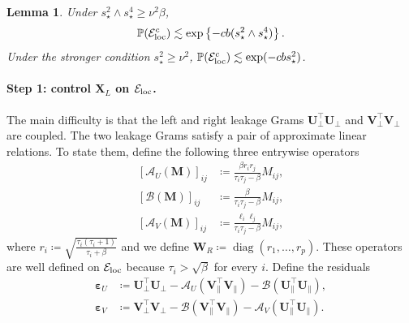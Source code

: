 \documentclass[11pt]{article}
\newtheorem{lemma}{Lemma}
\newcommand{\Pp}{\mathbb{P}}
\newcommand{\trans}{\top}
\DeclareMathOperator{\diag}{diag}
\newcommand{\cE}{\mathcal{E}}
\begin{document}
\begin{lemma}
\label{lem:one-view-localization}
Under $s_\star^2\wedge s_\star^4\ge\nu^2\beta$,
\begin{equation}
\label{eq:one-view-tail-under-left}
  \Pp(\cE_{\rm loc}^c)
  \lesssim
  \exp\left\{
    -c b(s_\star^2\wedge s_\star^4)
  \right\}.
\end{equation}
Under the stronger condition $s_\star^2\ge\nu^2$,
$\Pp(\cE_{\rm loc}^c)\lesssim\exp(-cbs_\star^2)$.
\end{lemma}


\paragraph{Step 1: control $\bm X_L$ on $\cE_{\rm loc}$.}
The main difficulty is that the left and right leakage Grams
$\bm U_\perp^\trans\bm U_\perp$ and
$\bm V_\perp^\trans\bm V_\perp$ are coupled. The two leakage Grams satisfy a pair of approximate linear relations. To state them, define the following three entrywise operators 
\begin{subequations}
\label{eq:one-view-population-operators}
\begin{align}
  [\mathcal A_U(\bm M)]_{ij}
  &\coloneqq
  \frac{\beta r_ir_j}{\tau_i\tau_j-\beta}M_{ij},
  \label{eq:one-view-population-operator-U}\\
  [\mathcal B(\bm M)]_{ij}
  &\coloneqq
  \frac{\beta}{\tau_i\tau_j-\beta}M_{ij},
  \label{eq:one-view-population-operator-B}\\
  [\mathcal A_V(\bm M)]_{ij}
  &\coloneqq
  \frac{\ell_i\ell_j}{\tau_i\tau_j-\beta}M_{ij},
  \label{eq:one-view-population-operator-V}
\end{align}
\end{subequations}
where $r_i\coloneqq\sqrt{\frac{\tau_i(\tau_i+1)}{\tau_i+\beta}}$ and we define $\bm W_R\coloneqq\diag(r_1,\ldots,r_p)$. 
These operators are well defined on $\cE_{\rm loc}$ because
$\tau_i>\sqrt\beta$ for every $i$. Define the residuals
\begin{subequations}
\label{eq:one-view-eps}
\begin{align}
  \bm\varepsilon_U
  &\coloneqq
  \bm U_\perp^\trans\bm U_\perp
  -
  \mathcal A_U(\bm V_\parallel^\trans\bm V_\parallel)
  -
  \mathcal B(\bm U_\parallel^\trans\bm U_\parallel),
  \label{eq:one-view-eps-U}\\
  \bm\varepsilon_V
  &\coloneqq
  \bm V_\perp^\trans\bm V_\perp
  -
  \mathcal B(\bm V_\parallel^\trans\bm V_\parallel)
  -
  \mathcal A_V(\bm U_\parallel^\trans\bm U_\parallel).
  \label{eq:one-view-eps-V}
\end{align}
\end{subequations}
\end{document}
